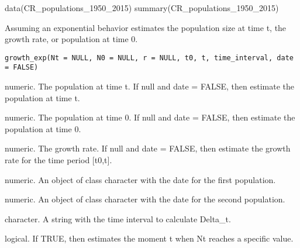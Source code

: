 \documentclass[a4paper]{book}
\begin{document}
%
\begin{Source}\relax
{}
\end{Source}
%
\begin{Examples}
\begin{ExampleCode}
data(CR_populations_1950_2015)
summary(CR_populations_1950_2015)
\end{ExampleCode}
\end{Examples}
%
\begin{Description}\relax
Assuming an exponential behavior estimates the population size at time t, the growth rate, or population at time 0.
\end{Description}
%
\begin{Usage}
\begin{verbatim}
growth_exp(Nt = NULL, N0 = NULL, r = NULL, t0, t, time_interval, date = FALSE)
\end{verbatim}
\end{Usage}
%
\begin{Arguments}
\begin{ldescription}
\item[\code{Nt}] numeric. The population at time t. If null and date = FALSE, then estimate the population at time t.

\item[\code{N0}] numeric. The population at time 0. If null and date = FALSE, then estimate the population at time 0.

\item[\code{r}] numeric. The growth rate. If null and date = FALSE, then estimate the growth rate for the time period [t0,t].

\item[\code{t0}] numeric. An object of class character with the date for the first population.

\item[\code{t}] numeric. An object of class character with the date for the second population.

\item[\code{time\_interval}] character. A string with the time interval to calculate Delta\_t.

\item[\code{date}] logical. If TRUE, then estimates the moment t when Nt reaches a specific value.
\end{ldescription}
\end{Arguments}
%
\end{document}
